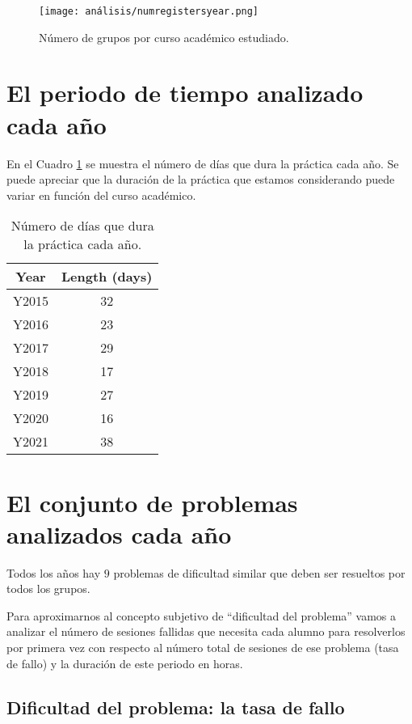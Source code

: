 \begin{figure}[H]
    \centering
    \texttt{[image: análisis/numregistersyear.png]}
    \caption{Número de grupos por curso académico estudiado.}
    \label{fig:groupsperyear}
\end{figure}

\section{El periodo de tiempo analizado cada año}

En el Cuadro \ref{tab:days} se muestra el número de días que dura la práctica cada año. Se puede apreciar que la duración de la práctica que estamos considerando puede variar en función del curso académico.

\begin{table}[H]
\centering
\caption{Número de días que dura la práctica cada año.}
\label{tab:days}
\begin{tabular}{cc}
\hline
\textbf{Year}  & \textbf{Length (days)}  \\ \hline
Y2015 & 32 \\
Y2016 & 23 \\
Y2017 & 29 \\
Y2018 & 17 \\
Y2019 & 27 \\
Y2020 & 16 \\
Y2021 & 38 \\ \hline
\end{tabular}
\end{table}

\section{El conjunto de problemas analizados cada año}

Todos los años hay $9$ problemas de dificultad similar que deben ser resueltos por todos los grupos.

Para aproximarnos al concepto subjetivo de ``dificultad del problema'' vamos a analizar el número de sesiones fallidas que necesita cada alumno para resolverlos por primera vez con respecto al número total de sesiones de ese problema (tasa de fallo) y la duración de este periodo en horas.

\subsection{Dificultad del problema: la tasa de fallo}

